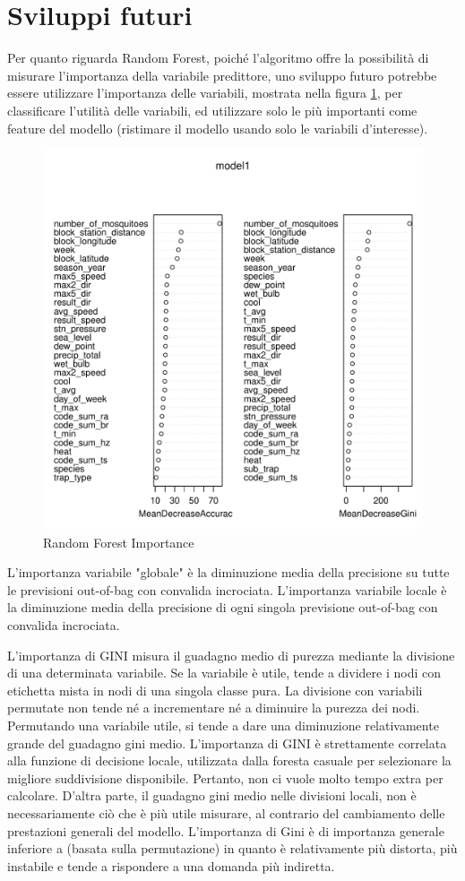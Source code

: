 \section{Sviluppi futuri}

Per quanto riguarda Random Forest, poiché l'algoritmo offre la possibilità di 
misurare l’importanza della variabile predittore, uno sviluppo futuro potrebbe 
essere utilizzare l'importanza delle variabili, mostrata nella figura 
\ref{fig:rf_importance}, per classificare l'utilità delle variabili, ed 
utilizzare solo le più importanti come feature del modello (ristimare il 
modello usando solo le variabili d’interesse). 

\begin{figure}[H]
	\centering
	\includegraphics[width=0.7\columnwidth]{images/ml/random_forest/HoldoutRF/model_importance}
	\caption{Random Forest Importance}
	\label{fig:rf_importance}
\end{figure}

L'importanza variabile "globale" è la diminuzione media della precisione su 
tutte le previsioni out-of-bag con convalida incrociata. 
L'importanza variabile locale è la diminuzione media della precisione 
di ogni singola previsione out-of-bag con convalida incrociata. 

L'importanza di GINI misura il guadagno medio di purezza mediante la 
divisione di una determinata variabile. Se la variabile è utile, tende a 
dividere i nodi con etichetta mista in nodi di una singola classe pura. La 
divisione con variabili permutate non tende né a incrementare né a diminuire la 
purezza dei nodi. 
Permutando una variabile utile, si tende a dare una diminuzione relativamente 
grande del guadagno gini medio. L'importanza di GINI è strettamente correlata 
alla funzione di decisione locale, utilizzata dalla foresta casuale per 
selezionare la migliore suddivisione disponibile. Pertanto, non ci vuole molto 
tempo extra per calcolare. D'altra parte, il guadagno gini medio nelle 
divisioni locali, non è necessariamente ciò che è più utile misurare, al 
contrario del cambiamento delle prestazioni generali del modello. 
L'importanza di Gini è di importanza generale inferiore a (basata sulla 
permutazione) in quanto è relativamente più distorta, più instabile e tende a 
rispondere a una domanda più indiretta.
